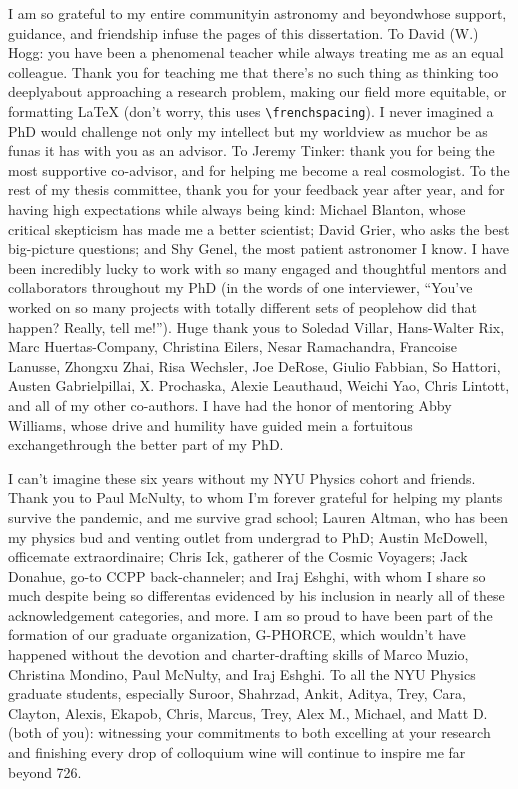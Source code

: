 I am so grateful to my entire community{\emdash}in astronomy and beyond{\emdash}whose support, guidance, and friendship infuse the pages of this dissertation.
To David (W.) Hogg: you have been a phenomenal teacher while always treating me as an equal colleague.
Thank you for teaching me that there's no such thing as thinking too deeply{\emdash}about approaching a research problem, making our field more equitable, or formatting {\LaTeX} (don't worry, this uses \verb|\frenchspacing|).
I never imagined a PhD would challenge not only my intellect but my worldview as much{\emdash}or be as fun{\emdash}as it has with you as an advisor.
To Jeremy Tinker: thank you for being the most supportive co-advisor, and for helping me become a real cosmologist.
To the rest of my thesis committee, thank you for your feedback year after year, and for having high expectations while always being kind: Michael Blanton, whose critical skepticism has made me a better scientist; David Grier, who asks the best big-picture questions; and Shy Genel, the most patient astronomer I know.
I have been incredibly lucky to work with so many engaged and thoughtful mentors and collaborators throughout my PhD (in the words of one interviewer, ``You've worked on so many projects with totally different sets of people{\emdash}how did that happen? Really, tell me!'').
Huge thank yous to Soledad Villar, Hans-Walter Rix, Marc Huertas-Company, Christina Eilers, Nesar Ramachandra, Francoise Lanusse, Zhongxu Zhai, Risa Wechsler, Joe DeRose, Giulio Fabbian, So Hattori, Austen Gabrielpillai, X. Prochaska, Alexie Leauthaud, Weichi Yao, Chris Lintott, and all of my other co-authors.
I have had the honor of mentoring Abby Williams, whose drive and humility have guided me{\emdash}in a fortuitous exchange{\emdash}through the better part of my PhD.

I can't imagine these six years without my NYU Physics cohort and friends. 
Thank you to Paul McNulty, to whom I'm forever grateful for helping my plants survive the pandemic, and me survive grad school; Lauren Altman, who has been my physics bud and venting outlet from undergrad to PhD; Austin McDowell, officemate extraordinaire; Chris Ick, gatherer of the Cosmic Voyagers; Jack Donahue, go-to CCPP back-channeler; and Iraj Eshghi, with whom I share so much despite being so different{\emdash}as evidenced by his inclusion in nearly all of these acknowledgement categories, and more.
I am so proud to have been part of the formation of our graduate organization, G-PHORCE, which wouldn't have happened without the devotion and charter-drafting skills of Marco Muzio, Christina Mondino, Paul McNulty, and Iraj Eshghi.
To all the NYU Physics graduate students, especially Suroor, Shahrzad, Ankit, Aditya, Trey, Cara, Clayton, Alexis, Ekapob, Chris, Marcus, Trey, Alex M., Michael, and Matt D. (both of you): witnessing your commitments to both excelling at your research and finishing every drop of colloquium wine will continue to inspire me far beyond 726.

